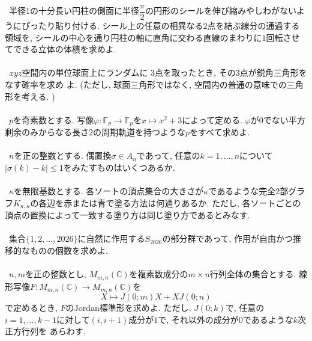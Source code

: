 \documentclass[a4paper, 10.5pt]{jsarticle}
\theoremstyle{definition}
\begin{document}
\noindent{}\ 半径$1$の十分長い円柱の側面に半径$\dfrac{\pi}{2}$の円形のシールを伸び縮みやしわがないようにぴったり貼り付ける. シール上の任意の相異なる$2$点を結ぶ線分の通過する領域を, シールの中心を通り円柱の軸に直角に交わる直線のまわりに$1$回転させてできる立体の体積を求めよ.
\\\\
\noindent{}\ $xyz$空間内の単位球面上にランダムに $3$点を取ったとき, その$3$点が鋭角三角形をなす確率を求め
よ. (ただし, 球面三角形ではなく, 空間内の普通の意味での三角形を考える. )
\\\\
\noindent{}\ $p$を奇素数とする. 写像$\varphi:\mathbb F_p\to\mathbb F_p$を$x \mapsto x^2 + 3$によって定める. $\varphi$が$0$でない平方剰余のみからなる長さ$2$の周期軌道を持つような$p$をすべて求めよ.
\\\\
\noindent{}\ $n$を正の整数とする. 偶置換$\sigma\in A_n$であって, 任意の$k=1, \ldots, n$について$\lvert\sigma(k)-k\rvert\le1$をみたすものはいくつあるか.
\\\\
\noindent{}\ $\kappa$を無限基数とする. 各ソートの頂点集合の大きさが$\kappa$であるような完全$2$部グラフ$K_{\kappa, \kappa}$の各辺を赤または青で塗る方法は何通りあるか. ただし, 各ソートごとの頂点の置換によって一致する塗り方は同じ塗り方であるとみなす.
\\\\
\noindent{}\ 集合$\{1, 2, \dots, 2026\}$に自然に作用する$S_{2026}$の部分群であって, 作用が自由かつ推移的なものの個数を求めよ.
\\\\
\noindent{}\ $n, m$を正の整数とし, $M_{m, n}(\mathbb C)$を複素数成分の$m\times n$行列全体の集合とする. 線形写像$F:M_{m, n}(\mathbb C)\to M_{m, n}(\mathbb C)$を
\[X\mapsto J(0;m)X+XJ(0;n)\]
で定めるとき, $F$のJordan標準形を求めよ. ただし, $J(0; k)$で, 任意の$i=1, \ldots, k-1$に対して$(i, i+1)$成分が$1$で, それ以外の成分が$0$であるような$k$次正方行列を
あらわす.
\end{document}
